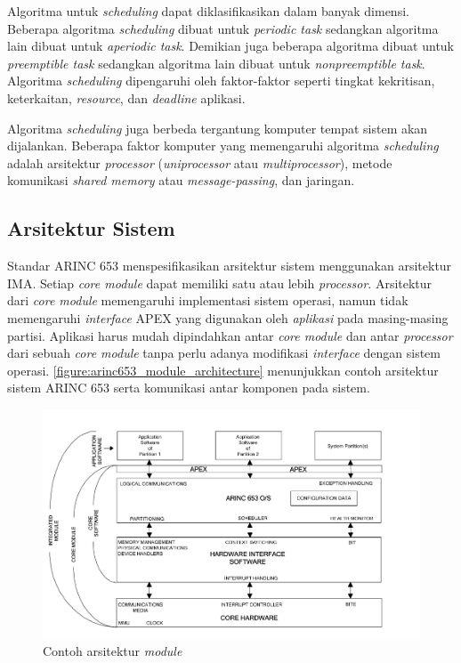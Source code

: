 Algoritma untuk \textit{scheduling} dapat diklasifikasikan dalam banyak dimensi.  Beberapa
algoritma \textit{scheduling} dibuat untuk \textit{periodic task} sedangkan algoritma lain
dibuat untuk \textit{aperiodic task}.  Demikian juga beberapa algoritma dibuat untuk
\textit{preemptible task} sedangkan algoritma lain dibuat untuk \textit{nonpreemptible task}.
Algoritma \textit{scheduling} dipengaruhi oleh faktor-faktor seperti tingkat kekritisan,
keterkaitan, \textit{resource}, dan \textit{deadline} aplikasi.

Algoritma \textit{scheduling} juga berbeda tergantung komputer tempat sistem akan dijalankan.
Beberapa faktor komputer yang memengaruhi algoritma \textit{scheduling} adalah arsitektur
\textit{processor} (\textit{uniprocessor} atau \textit{multiprocessor}), metode komunikasi
\textit{shared memory} atau \textit{message-passing}, dan jaringan.

\subsection{Arsitektur Sistem}

Standar ARINC 653 menspesifikasikan arsitektur sistem menggunakan arsitektur IMA.  Setiap
\textit{core module} dapat memiliki satu atau lebih \textit{processor}. Arsitektur dari
\textit{core module} memengaruhi implementasi sistem operasi, namun tidak memengaruhi
\textit{interface} APEX yang digunakan oleh \textit{aplikasi} pada masing-masing partisi.
Aplikasi harus mudah dipindahkan antar \textit{core module} dan antar \textit{processor} dari
sebuah \textit{core module} tanpa perlu adanya modifikasi \textit{interface} dengan sistem
operasi.  \autoref{figure:arinc653_module_architecture} menunjukkan contoh arsitektur sistem
ARINC 653 serta komunikasi antar komponen pada sistem.

\begin{figure}[htbp]
    \centering
    \includegraphics[scale=0.4]{resources/arinc653-architecture.png}
    \caption[Contoh arsitektur \textit{module}]{Contoh arsitektur \textit{module} \citep{AirlinesElectronicEngineeringCommittee2012}}
    \label{figure:arinc653_module_architecture}
\end{figure}

